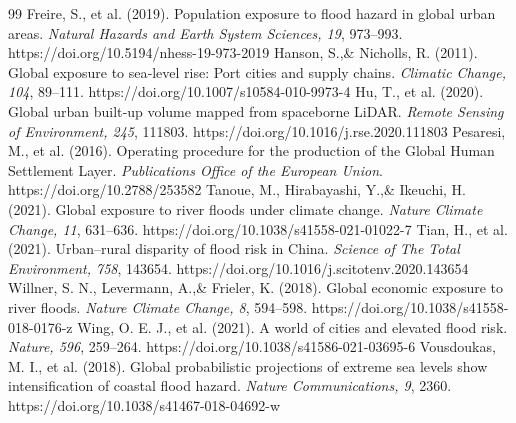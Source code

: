 \documentclass[a4paper,11pt]{article}
\begin{document}
\begin{thebibliography}{99}
 Freire, S., et al. (2019). Population exposure to flood hazard in global urban areas. \emph{Natural Hazards and Earth System Sciences, 19}, 973–993. https://doi.org/10.5194/nhess-19-973-2019
 Hanson, S.,\& Nicholls, R. (2011). Global exposure to sea‑level rise: Port cities and supply chains. \emph{Climatic Change, 104}, 89–111. https://doi.org/10.1007/s10584-010-9973-4
 Hu, T., et al. (2020). Global urban built‑up volume mapped from spaceborne LiDAR. \emph{Remote Sensing of Environment, 245}, 111803. https://doi.org/10.1016/j.rse.2020.111803
 Pesaresi, M., et al. (2016). Operating procedure for the production of the Global Human Settlement Layer. \emph{Publications Office of the European Union}. https://doi.org/10.2788/253582
 Tanoue, M., Hirabayashi, Y.,\& Ikeuchi, H. (2021). Global exposure to river floods under climate change. \emph{Nature Climate Change, 11}, 631–636. https://doi.org/10.1038/s41558-021-01022-7
 Tian, H., et al. (2021). Urban–rural disparity of flood risk in China. \emph{Science of The Total Environment, 758}, 143654. https://doi.org/10.1016/j.scitotenv.2020.143654
 Willner, S. N., Levermann, A.,\& Frieler, K. (2018). Global economic exposure to river floods. \emph{Nature Climate Change, 8}, 594–598. https://doi.org/10.1038/s41558-018-0176-z
 Wing, O. E. J., et al. (2021). A world of cities and elevated flood risk. \emph{Nature, 596}, 259–264. https://doi.org/10.1038/s41586-021-03695-6
 Vousdoukas, M. I., et al. (2018). Global probabilistic projections of extreme sea levels show intensification of coastal flood hazard. \emph{Nature Communications, 9}, 2360. https://doi.org/10.1038/s41467-018-04692-w
\end{thebibliography}
\end{document}
